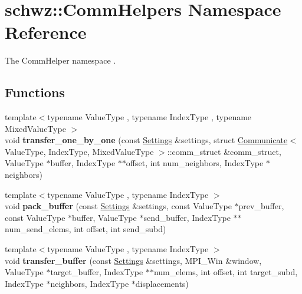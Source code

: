 \hypertarget{namespaceschwz_1_1CommHelpers}{}\section{schwz\+:\+:Comm\+Helpers Namespace Reference}
\label{namespaceschwz_1_1CommHelpers}


The Comm\+Helper namespace .  


\subsection*{Functions}
\begin{DoxyCompactItemize}
\item 
\mbox{\label{namespaceschwz_1_1CommHelpers_ad55122b484f131b8b63e7d82e8ff6e88}} 
{\footnotesize template$<$typename Value\+Type , typename Index\+Type , typename Mixed\+Value\+Type $>$ }\\void {\bfseries transfer\+\_\+one\+\_\+by\+\_\+one} (const \hyperlink{structschwz_1_1Settings}{Settings} \&settings, struct \hyperlink{classschwz_1_1Communicate}{Communicate}$<$ Value\+Type, Index\+Type, Mixed\+Value\+Type $>$\+::comm\+\_\+struct \&comm\+\_\+struct, Value\+Type $\ast$buffer, Index\+Type $\ast$$\ast$offset, int num\+\_\+neighbors, Index\+Type $\ast$neighbors)
\item 
\mbox{\label{namespaceschwz_1_1CommHelpers_a53666b2d814707ecc77955391bc0d9e6}} 
{\footnotesize template$<$typename Value\+Type , typename Index\+Type $>$ }\\void {\bfseries pack\+\_\+buffer} (const \hyperlink{structschwz_1_1Settings}{Settings} \&settings, const Value\+Type $\ast$prev\+\_\+buffer, const Value\+Type $\ast$buffer, Value\+Type $\ast$send\+\_\+buffer, Index\+Type $\ast$$\ast$num\+\_\+send\+\_\+elems, int offset, int send\+\_\+subd)
\item 
\mbox{\label{namespaceschwz_1_1CommHelpers_a05d10520ce2980f012ca6e89916801b4}} 
{\footnotesize template$<$typename Value\+Type , typename Index\+Type $>$ }\\void {\bfseries transfer\+\_\+buffer} (const \hyperlink{structschwz_1_1Settings}{Settings} \&settings, M\+P\+I\+\_\+\+Win \&window, Value\+Type $\ast$target\+\_\+buffer, Index\+Type $\ast$$\ast$num\+\_\+elems, int offset, int target\+\_\+subd, Index\+Type $\ast$neighbors, Index\+Type $\ast$displacements)
$$
\end{DoxyCompactItemize}
